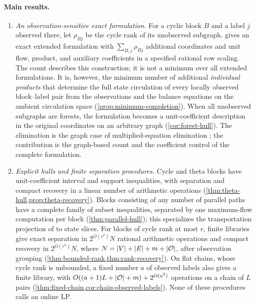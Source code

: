 \paragraph{Main results.}
\begin{enumerate}[leftmargin=*,itemsep=5pt]
\item \emph{An observation-sensitive exact formulation.}
For a cyclic block $B$ and a label $j$ observed there, let $\rho_{Bj}$
be the cycle rank of its unobserved subgraph.
 gives an exact extended formulation with
$\sum_{B,j}\rho_{Bj}$ additional coordinates and unit flow, product, and
auxiliary coefficients in a specified rational row scaling. The count
describes this construction; it is not a minimum over all extended
formulations. It is, however, the minimum number of additional
\emph{individual products} that determine the full state circulation of
every locally observed block--label pair from the observations and the
balance equations on the ambient circulation space
(\cref{prop:minimum-completion}). When all unobserved subgraphs are
forests, the formulation becomes a unit-coefficient description in the
original coordinates on an arbitrary graph (\cref{cor:forest-hull}). The
elimination is the graph case of multiplied-equation elimination
\citep{LibertiPantelides2006}; the contribution is the graph-based count and the
coefficient control of the complete formulation.

\item \emph{Explicit hulls and finite separation procedures.}
Cycle and theta blocks have unit-coefficient interval and support
inequalities, with separation and compact recovery in a linear number of
arithmetic operations (\cref{thm:theta-hull,prop:theta-recovery}). Blocks
consisting of any number of parallel paths have a complete family of subset
inequalities, separated by one maximum-flow computation per block
(\cref{thm:parallel-hull}); this specializes the transportation projection of
\citet{KisHorvath2022} to state slices. For blocks of cycle rank at most $r$,
finite libraries give exact separation in $2^{O(r^2)}N$ rational arithmetic
operations and compact recovery in $2^{O(r^3)}N$, where
$N=|V|+|E|+m+|\mathcal O|$, after observation grouping
(\cref{thm:bounded-rank,thm:rank-recovery}). On flat chains, whose cycle rank
is unbounded, a fixed number $a$ of observed labels also gives a finite
library, with $O((a+1)L+|\mathcal O|+m)+2^{O(a^2)}$ operations on a chain of $L$
pairs (\cref{thm:fixed-chain,cor:chain-observed-labels}). None of these
procedures calls an online LP.


\end{enumerate}
